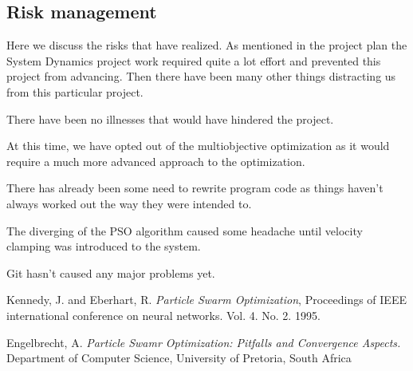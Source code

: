 \documentclass[twoside]{article}
\begin{document}
\begin{multicols}{2}

\section{Risk management}

Here we discuss the risks that have realized. As mentioned in the project plan the System Dynamics project work required quite a lot effort and prevented this project from advancing. Then there have been many other things distracting us from this particular project.

There have been no illnesses that would have hindered the project.

At this time, we have opted out of the multiobjective optimization as it would require a much more advanced approach to the optimization.

There has already been some need to rewrite program code as things haven't always worked out the way they were intended to.

The diverging of the PSO algorithm caused some headache until velocity clamping was introduced to the system. 

Git hasn't caused any major problems yet.



\begin{thebibliography}{99} %

 Kennedy, J. and Eberhart, R.
  \emph{Particle Swarm Optimization},
 Proceedings of IEEE international conference on neural networks. Vol. 4. No. 2. 1995. 
 
 Engelbrecht, A. \emph{Particle Swamr Optimization: Pitfalls and Convergence Aspects.}
 Department of Computer Science, University of Pretoria, South Africa
 
 
\end{thebibliography}


\end{multicols}
\end{document}
